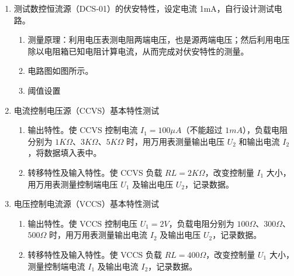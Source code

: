 \documentclass[dvipsnames, svgnames,a4paper,11pt]{article}
\begin{document}
\begin{enumerate}
		\item 测试数控恒流源（DCS-01）的伏安特性，设定电流 1mA，自行设计测试电路。
		\begin{enumerate}
			\item 测量原理：利用电压表测电阻两端电压，也是源两端电压；然后利用电压除以电阻箱已知电阻计算电流，从而完成对伏安特性的测量。
			\item 电路图如图所示。
			\item 阈值设置
		\end{enumerate}
		
		\item 电流控制电压源（CCVS）基本特性测试
		\begin{enumerate}
			\item 输出特性。使 CCVS 控制电流 \(I_1=100\mu A\)（不能超过 \(1mA\)），负载电阻分别为 \(1K\Omega\)、\(3K\Omega\)、\(5K\Omega\) 时，用万用表测量输出电压 \(U_2\) 和输出电流 \(I_2\)，将数据填入表中。
			\item 转移特性及输入特性。使 CCVS 负载 \(RL = 2K\Omega\)，改变控制量 \(I_1\) 大小，用万用表测量控制端电压 \(U_1\) 及输出电压 \(U_2\)，记录数据。
		\end{enumerate}
		
		\item 电压控制电流源（VCCS）基本特性测试
		\begin{enumerate}
			\item 输出特性。使 VCCS 控制电压 \(U_1=2V\)，负载电阻分别为 \(100\Omega\)、\(300\Omega\)、\(500\Omega\) 时，用万用表测量输出电流 \(I_2\) 及输出电压 \(U_2\)，记录数据。
			\item 转移特性及输入特性。使 VCCS 负载 \(RL = 400\Omega\)，改变控制量 \(U_1\) 大小，测量控制端电流 \(I_1\) 及输出电流 \(I_2\)，记录数据。
		\end{enumerate}
	\end{enumerate}	
	
\end{document}
